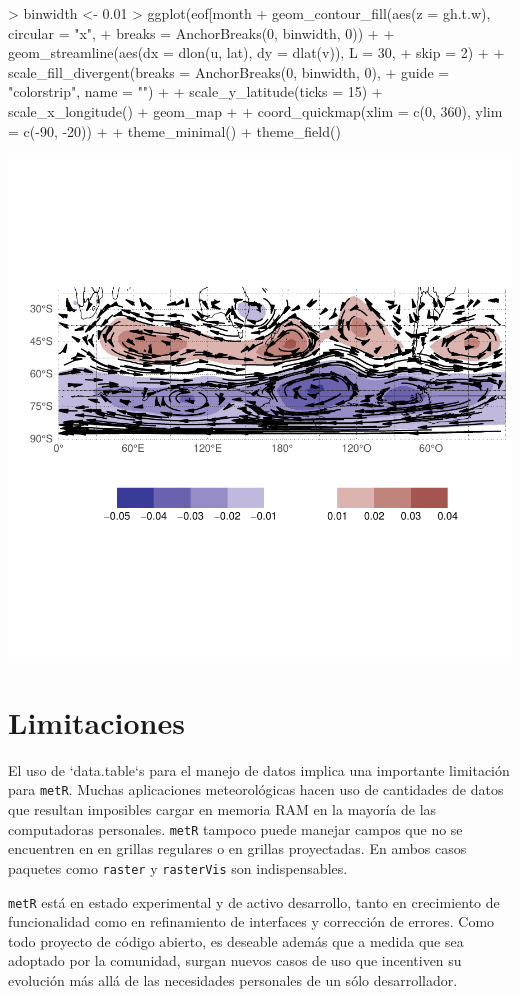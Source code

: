 \documentclass[runningheads]{llncs}
\begin{document}
\begin{Schunk}
\begin{Sinput}
> binwidth <- 0.01
> ggplot(eof[month %
+    geom_contour_fill(aes(z = gh.t.w), circular = "x", 
+                      breaks = AnchorBreaks(0, binwidth, 0)) +
+    geom_streamline(aes(dx = dlon(u, lat), dy = dlat(v)), L = 30, 
+                    skip = 2) +
+    scale_fill_divergent(breaks = AnchorBreaks(0, binwidth, 0), 
+                         guide = "colorstrip", name = "") +
+    scale_y_latitude(ticks = 15) + scale_x_longitude() + geom_map +
+    coord_quickmap(xlim = c(0, 360), ylim = c(-90, -20)) +
+    theme_minimal() + theme_field()
\end{Sinput}
\end{Schunk}
\includegraphics{abstract-example-plot}

\section{Limitaciones}

El uso de `data.table`s para el manejo de datos implica una importante limitación para \texttt{metR}. Muchas aplicaciones meteorológicas hacen uso de cantidades de datos que resultan imposibles cargar en memoria RAM en la mayoría de las computadoras personales. \texttt{metR} tampoco puede manejar campos que no se encuentren en en grillas regulares o en grillas proyectadas. En ambos casos paquetes como \texttt{raster} y \texttt{rasterVis} son indispensables. 

\texttt{metR} está en estado experimental y de activo desarrollo, tanto en crecimiento de funcionalidad como en refinamiento de interfaces y corrección de errores. Como todo proyecto de código abierto, es deseable además que a medida que sea adoptado por la comunidad, surgan nuevos casos de uso que incentiven su evolución más allá de las necesidades personales de un sólo desarrollador. 
\end{document}
